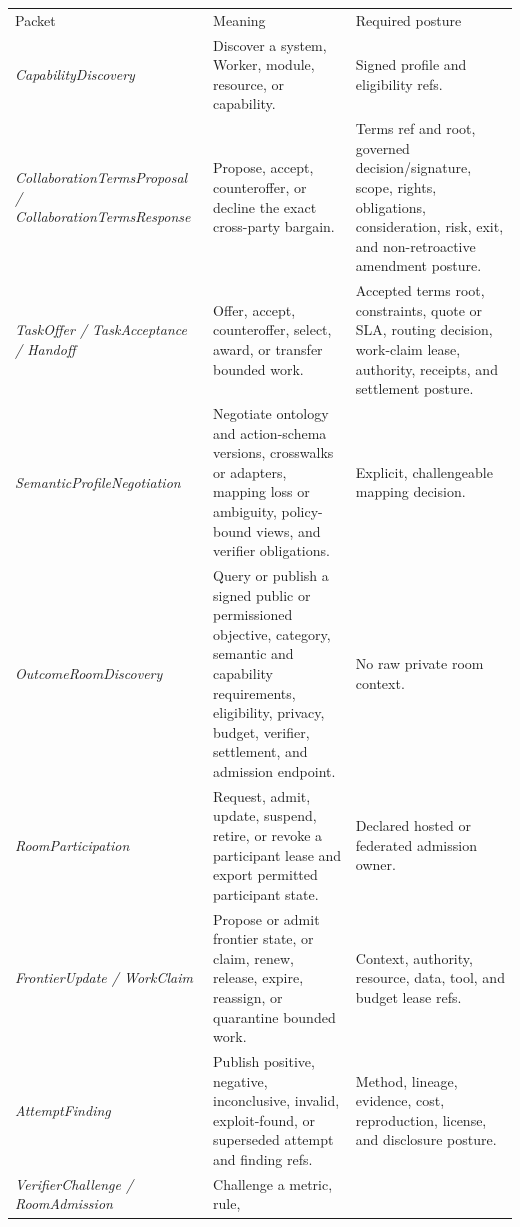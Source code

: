 \documentclass[
  11pt,
]{article}
\begin{document}
\begin{longtable}[]{@{}
  >{\raggedright\arraybackslash}p{}
  >{\raggedright\arraybackslash}p{}
  >{\raggedright\arraybackslash}p{}@{}}
\toprule\noalign{}
& & \\
\midrule\noalign{}
\endhead
\bottomrule\noalign{}
\endlastfoot
Packet & Meaning & Required posture \\
\emph{CapabilityDiscovery} & Discover a system, Worker, module, resource,
or capability. & Signed profile and eligibility refs. \\
\emph{CollaborationTermsProposal / CollaborationTermsResponse} & Propose,
accept, counteroffer, or decline the exact cross-party bargain. & Terms ref and
root, governed decision/signature, scope, rights, obligations, consideration,
risk, exit, and non-retroactive amendment posture. \\
\emph{TaskOffer / TaskAcceptance / Handoff} & Offer, accept, counteroffer,
select, award, or transfer bounded work. & Accepted terms root, constraints,
quote or SLA, routing decision, work-claim lease, authority, receipts, and
settlement posture. \\
\emph{SemanticProfileNegotiation} & Negotiate ontology and action-schema
versions, crosswalks or adapters, mapping loss or ambiguity, policy-bound
views, and verifier obligations. & Explicit, challengeable mapping decision. \\
\emph{OutcomeRoomDiscovery} & Query or publish a signed public or
permissioned objective, category, semantic and capability requirements,
eligibility, privacy, budget, verifier, settlement, and admission endpoint. &
No raw private room context. \\
\emph{RoomParticipation} & Request, admit, update, suspend, retire, or revoke
a participant lease and export permitted participant state. & Declared hosted
or federated admission owner. \\
\emph{FrontierUpdate / WorkClaim} & Propose or admit frontier state, or
claim, renew, release, expire, reassign, or quarantine bounded work. & Context,
authority, resource, data, tool, and budget lease refs. \\
\emph{AttemptFinding} & Publish positive, negative, inconclusive, invalid,
exploit-found, or superseded attempt and finding refs. & Method, lineage,
evidence, cost, reproduction, license, and disclosure posture. \\
\emph{VerifierChallenge / RoomAdmission} & Challenge a metric, rule,

\end{longtable}
\end{document}
